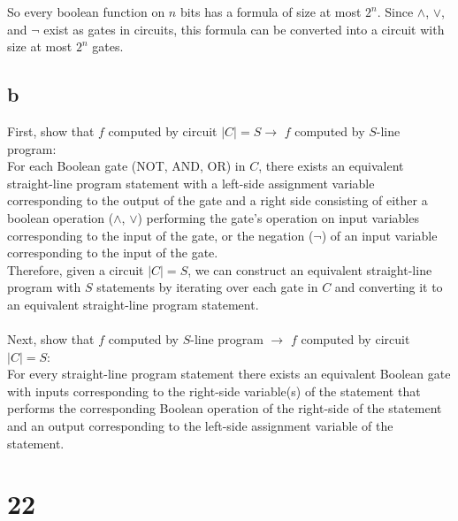 \documentclass[letterpaper,notitlepage,twoside]{article}
\begin{document}
So every boolean function on $n$ bits has a formula of size at most $2^n$.
Since $\land$, $\lor$, and $\neg$ exist as gates in circuits, this formula can be converted into a circuit with size at most $2^n$ gates.

\subsection*{b}
First, show that $f$ computed by circuit $|C| = S \rightarrow$ $f$ computed by $S$-line program: \\
For each Boolean gate (NOT, AND, OR) in $C$, there exists an equivalent straight-line program statement with a left-side assignment variable corresponding to the output of the gate and a right side consisting of either a boolean operation ($\land$, $\lor$) performing the gate's operation on input variables corresponding to the input of the gate, or the negation ($\neg$) of an input variable corresponding to the input of the gate. \\
Therefore, given a circuit $|C| = S$, we can construct an equivalent straight-line program with $S$ statements by iterating over each gate in $C$ and converting it to an equivalent straight-line program statement. \\ \\
Next, show that $f$ computed by $S$-line program $\rightarrow$ $f$ computed by circuit $|C| = S$: \\
For every straight-line program statement there exists an equivalent Boolean gate with inputs corresponding to the right-side variable(s) of the statement that performs the corresponding Boolean operation of the right-side of the statement and an output corresponding to the left-side assignment variable of the statement.

\section*{22}
\end{document}
